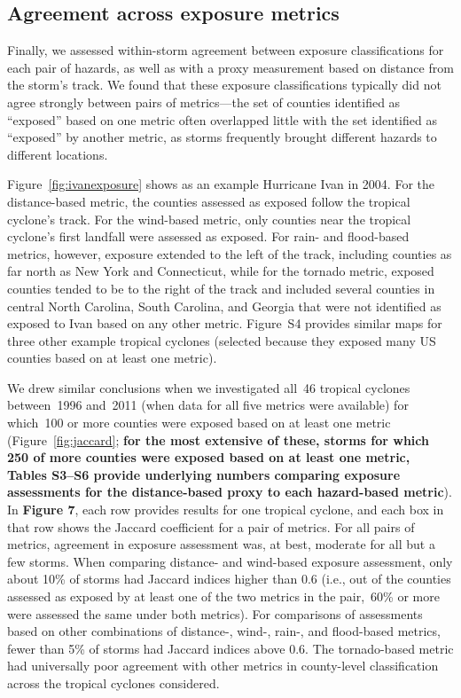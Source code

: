 \subsection*{Agreement across exposure metrics}

Finally, we assessed within-storm agreement between exposure classifications
for each pair of hazards, as well as with a proxy measurement based on distance
from the storm's track. We found that these exposure classifications typically
did not agree strongly between pairs of metrics---the set of counties
identified as ``exposed'' based on one metric often overlapped little with the
set identified as ``exposed'' by another metric, as storms frequently brought
different hazards to different locations. 

Figure~\ref{fig:ivanexposure} shows as an example Hurricane Ivan in 2004.
For the distance-based metric, the counties assessed as exposed follow the
tropical cyclone's track. For the wind-based metric,
only counties near the tropical cyclone's first landfall were assessed as
exposed. For rain- and flood-based metrics, however, exposure extended to the
left of the track, including counties as far north as New York and Connecticut,
while for the tornado metric, exposed counties tended to be to the right of the
track and included several counties in central North Carolina, South Carolina,
and Georgia that were not identified as exposed to Ivan based on any other
metric. Figure~S4 provides similar maps for three other example tropical
cyclones (selected because they exposed many \ac{US}  counties based on at
least one metric).

We drew similar conclusions when we investigated all~46 tropical cyclones
between~1996 and~2011 (when data for all five metrics were available) for
which~100 or more counties were exposed based on at least one metric
(Figure~\ref{fig:jaccard}; \textbf{for the most extensive of these, storms for
which 250 of more counties were exposed based on at least one metric, Tables
S3--S6 provide underlying numbers comparing exposure assessments for the
distance-based proxy to each hazard-based metric}). In \textbf{Figure 7}, each row
provides results for one tropical cyclone, and each box in that row shows the
Jaccard coefficient for a pair of metrics. For all pairs of metrics, agreement
in exposure assessment was, at best, moderate for all but a few storms. When
comparing distance- and wind-based exposure assessment, only about 10\% of
storms had Jaccard indices higher than 0.6 (i.e., out of the counties assessed
as exposed by at least one of the two metrics in the pair,~60\si{\percent} or
more were assessed the same under both metrics). For comparisons of assessments
based on other combinations of distance-, wind-, rain-, and flood-based
metrics, fewer than 5\% of storms had Jaccard indices above 0.6.  The
tornado-based metric had universally poor agreement with other metrics in
county-level classification across the tropical cyclones considered.  

